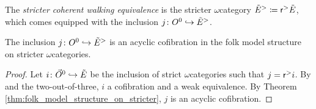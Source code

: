 \begin{dfn} 
    The \emph{stricter coherent walking equivalence} is the stricter \( \omega \)\nbd category \( \tilde E^> \coloneqq \mathsf{r}^{>} \tilde E \), which comes equipped with the inclusion \( j \colon O^{0} \hookrightarrow \tilde E^> \).
\end{dfn}

\begin{lem} \label{lem:inclusion_into_stricter_is_equivalence}
    The inclusion \( j \colon O^{0} \hookrightarrow \tilde E^> \) is an acyclic cofibration in the folk model structure on stricter \( \omega \)\nbd categories.
\end{lem}
\begin{proof}
    Let \( i \colon \vec{O}^{0} \hookrightarrow \tilde E \) be the inclusion of strict \( \omega \)\nbd categories such that \( j = \mathsf{r}^{>} i \).
    By \cite[Remark 1.29, Theorem 1.33]{hadzihasanovic2024model} and the two-out-of-three, \( i \) a cofibration and a weak equivalence.
    By Theorem \ref{thm:folk_model_structure_on_stricter}, \( j \) is an acyclic cofibration. 
\end{proof}

